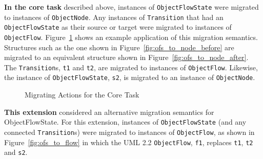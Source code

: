 \textbf{In the core task} described above, instances of \texttt{Ob\-je\-ctFl\-owSt\-a\-te} were migrated to instances of \texttt{Ob\-je\-ctNo\-de}. Any instances of \texttt{Tr\-an\-si\-ti\-on} that had an \texttt{Ob\-je\-ctFl\-owSt\-a\-te} as their source or target were migrated to instances of \texttt{Ob\-je\-ctFl\-ow}. Figure~\ref{fig:ofs_to_node} shows an example application of this migration semantics. Structures such as the one shown in Figure~\ref{fig:ofs_to_node_before} are migrated to an equivalent structure shown in Figure~\ref{fig:ofs_to_node_after}. The \texttt{Tr\-an\-si\-ti\-on}s, \texttt{t1} and \texttt{t2}, are migrated to instances of \texttt{Ob\-je\-ctFl\-ow}. Likewise, the instance of \texttt{Ob\-je\-ctFl\-owSt\-a\-te}, \texttt{s2}, is migrated to an instance of \texttt{Ob\-je\-ctNo\-de}.

\begin{figure}[htbp]
	\centering
	\caption{Migrating Actions for the Core Task}
\label{fig:ofs_to_node}
\end{figure}


\textbf{This extension} considered an alternative migration semantics for ObjectFlowState. For this extension, instances of \texttt{Ob\-je\-ctFl\-owSt\-a\-te} (and any connected \texttt{Tr\-an\-si\-ti\-on}s) were migrated to instances of  \texttt{Ob\-je\-ctFl\-ow}, as shown in Figure~\ref{fig:ofs_to_flow} in which the UML 2.2 \texttt{Ob\-je\-ctFl\-ow}, \texttt{f1}, replaces \texttt{t1}, \texttt{t2} and \texttt{s2}.

